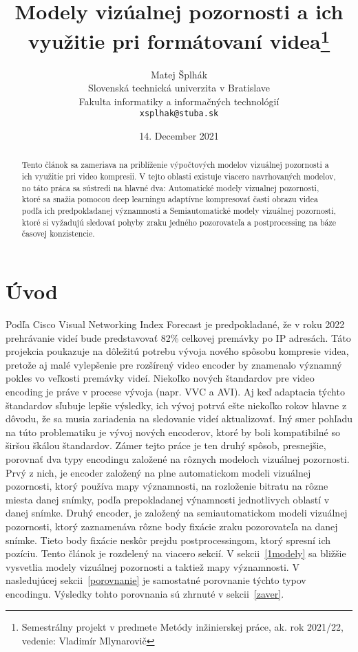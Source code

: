 \documentclass[10pt,twoside,slovak,a4paper]{article}
\title{Modely vizúalnej pozornosti a ich využitie pri formátovaní videa\thanks{Semestrálny projekt v predmete Metódy inžinierskej práce, ak. rok 2021/22, vedenie: Vladimír Mlynarovič}} %
\author{Matej Šplhák\\[2pt]
	{\small Slovenská technická univerzita v Bratislave}\\
	{\small Fakulta informatiky a informačných technológií}\\
	{\small \texttt{xsplhak@stuba.sk}}
	}
\date{\small 14. December 2021} %
\begin{document}
\maketitle
\begin{abstract}
Tento článok sa zameriava na priblíženie výpočtových modelov vizuálnej pozornosti a ich využitie pri video kompresii. V tejto oblasti existuje viacero navrhovaných modelov, no táto práca sa sústredi na hlavné dva: Automatické modely vizualnej pozornosti, ktoré sa snažia pomocou deep learningu adaptívne kompresovať časti obrazu videa podľa ich predpokladanej významnosti a Semiautomatické modely vizuálnej pozornosti, ktoré  si vyžadujú sledovať pohyby zraku jedného pozorovateľa a postprocessing na báze časovej konzistencie. 
\end{abstract}


\section{Úvod}
Podľa Cisco  Visual  Networking  Index  Forecast\cite{cisco:forecast} je predpokladané, že v roku 2022 prehrávanie videí bude predstavovať 82\% celkovej premávky po IP adresách. Táto projekcia poukazuje na dôležitú potrebu vývoja nového spôsobu kompresie videa, pretože aj malé vylepšenie pre rozšírený video encoder by znamenalo významný pokles vo veľkosti premávky videí. Niekoľko nových štandardov pre video encoding je práve v procese vývoja (napr. VVC a AVI). Aj keď adaptacia týchto štandardov sľubuje lepšie výsledky, ich vývoj potrvá ešte niekoľko rokov hlavne z dôvodu, že sa musia zariadenia na sledovanie videí aktualizovať. Iný smer pohľadu na túto problematiku je vývoj nových encoderov, ktoré by boli kompatibilné so širšou škálou štandardov. Zámer tejto práce je ten druhý spôsob, presnejšie, porovnať dva typy encodingu založené na rôznych modeloch vizuálnej pozornosti. Prvý z nich\cite{Czarnecki:Progress}, je encoder založený na plne automatickom modeli vizuálnej pozornosti, ktorý používa mapy významnosti, na rozloženie bitratu na rôzne miesta danej snímky, podľa prepokladanej výnamnosti jednotlivych oblastí v danej snímke. Druhý encoder\cite{Coplien:MPD}, je založený na semiautomatickom modeli vizuálnej pozornosti, ktorý zaznamenáva rôzne body fixácie zraku pozorovateľa na danej snímke. Tieto body fixácie neskôr prejdu postprocessingom, ktorý spresní ich pozíciu. Tento článok je rozdelený na viacero sekcií. V sekcii~\ref{1modely} sa bližšie vysvetlia modely vizuálnej pozornosti a taktiež mapy významnosti. V nasledujúcej sekcii~\ref{porovnanie} je samostatné porovnanie týchto typov encodingu. Výsledky tohto porovnania sú zhrnuté v sekcii~\ref{zaver}.   
\end{document}
